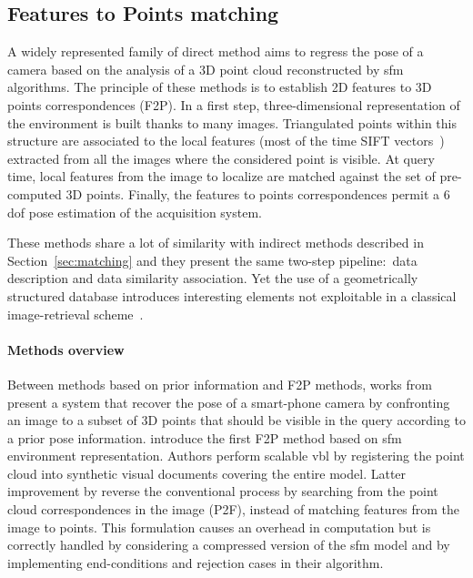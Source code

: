 	\subsection{Features to Points matching}
		\label{subsec:sfm_methods}						
		A widely represented family of direct method aims to regress the pose of a camera based on the analysis of a 3D point cloud reconstructed by \ac{sfm} algorithms. The principle of these methods is to establish 2D features to 3D points correspondences (F2P). In a first step, three-dimensional representation of the environment is built thanks to many images. Triangulated points within this structure are associated to the local features (most of the time SIFT vectors~\citep{Lowe2004}) extracted from all the images where the considered point is visible. At query time, local features from the image to localize are matched against the set of pre-computed 3D points. Finally, the features to points correspondences permit a 6 \ac{dof} pose estimation of the acquisition system.
 
		These methods share a lot of similarity with indirect methods described in Section~\ref{sec:matching} and they present the same two-step pipeline:~data description and data similarity association. Yet the use of a geometrically structured database introduces interesting elements not exploitable in a classical image-retrieval scheme~\citep{Sattler2012a}.
		
		\paragraph{Methods overview}
			Between methods based on prior information and F2P methods, works from \citet{Arth2009} present a system that recover the pose of a smart-phone camera by confronting an image to a subset of 3D points that should be visible in the query according to a prior pose information. \citet{Irschara2009} introduce the first F2P method based on \ac{sfm} environment representation. Authors perform scalable \ac{vbl} by registering the point cloud into synthetic visual documents covering the entire model. Latter improvement by \citet{Li2010} reverse the conventional process by searching from the point cloud correspondences in the image (P2F), instead of matching features from the image to points. This formulation causes an overhead in computation but is correctly handled by considering a compressed version of the \ac{sfm} model and by implementing end-conditions and rejection cases in their algorithm.
			
